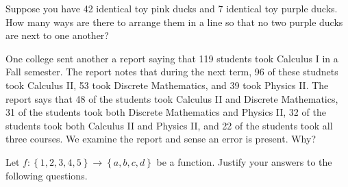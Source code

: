 \documentclass[11pt,answers,addpoints]{exam}
\def\set#1{\left\{ {#1} \right\}}
\begin{document}
\begin{questions}







\question[10] Suppose you have 42 identical toy pink ducks and 7 identical toy purple ducks. How many ways are there to arrange them in a line so that no two purple ducks are next to one another?%

\vfill

\question[15] One college sent another a report saying that 119 students took Calculus I in a Fall semester. The report notes that during the next term, 96 of these studnets took Calculus II, 53 took Discrete Mathematics, and 39 took Physics II. The report says that 48 of the students took Calculus II and Discrete Mathematics, 31 of the students took both Discrete Mathematics and Physics II, 32 of the students took both Calculus II and Physics II, and 22 of the students took all three courses. We examine the report and sense an error is present. Why?

\begin{solution}

\end{solution}

\vfill

\newpage

\question[8] Let $f : \set{1,2,3,4,5} \to \set{a,b,c,d}$ be a function. Justify your answers to the following questions.

\end{questions}
\end{document}
